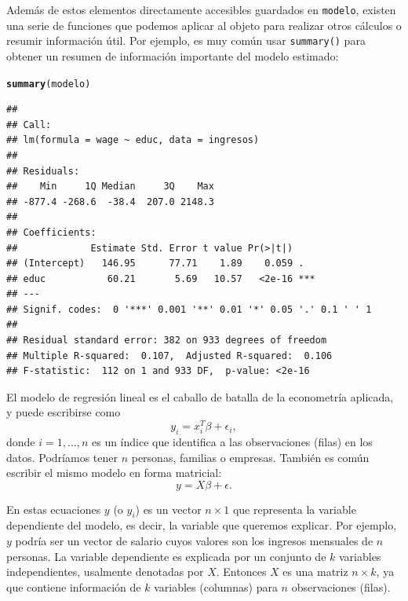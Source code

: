 \documentclass{article}\usepackage[]{graphicx}\usepackage[]{color}
\makeatletter
\newcommand{\hlstd}[1]{\textcolor[rgb]{0.345,0.345,0.345}{#1}}%
\newcommand{\hlkwd}[1]{\textcolor[rgb]{0.737,0.353,0.396}{\textbf{#1}}}%
\newenvironment{kframe}{%
 \def\at@end@of@kframe{}%
 \ifinner\ifhmode%
  \def\at@end@of@kframe{\end{minipage}}%
  \begin{minipage}{\columnwidth}%
 \fi\fi%
 \def\FrameCommand##1{\hskip\@totalleftmargin \hskip-\fboxsep
 \colorbox{shadecolor}{##1}\hskip-\fboxsep
     \hskip-\linewidth \hskip-\@totalleftmargin \hskip\columnwidth}%
 \MakeFramed {\advance\hsize-\width
   \@totalleftmargin\z@ \linewidth\hsize
   \@setminipage}}%
 {\par\unskip\endMakeFramed%
 \at@end@of@kframe}
\newenvironment{knitrout}{}{} %
\makeatother
\begin{document}
Además de estos elementos directamente accesibles guardados en \verb|modelo|, existen una serie de funciones que podemos aplicar al objeto para realizar otros cálculos o resumir información útil. Por ejemplo, es muy común usar \verb|summary()| para obtener un resumen de información importante del modelo estimado:
\begin{knitrout}
\color{fgcolor}\begin{kframe}
\begin{alltt}
\hlkwd{summary}\hlstd{(modelo)}
\end{alltt}
\begin{verbatim}
## 
## Call:
## lm(formula = wage ~ educ, data = ingresos)
## 
## Residuals:
##    Min     1Q Median     3Q    Max 
## -877.4 -268.6  -38.4  207.0 2148.3 
## 
## Coefficients:
##             Estimate Std. Error t value Pr(>|t|)    
## (Intercept)   146.95      77.71    1.89    0.059 .  
## educ           60.21       5.69   10.57   <2e-16 ***
## ---
## Signif. codes:  0 '***' 0.001 '**' 0.01 '*' 0.05 '.' 0.1 ' ' 1
## 
## Residual standard error: 382 on 933 degrees of freedom
## Multiple R-squared:  0.107,	Adjusted R-squared:  0.106 
## F-statistic:  112 on 1 and 933 DF,  p-value: <2e-16
\end{verbatim}
\end{kframe}
\end{knitrout}



\hrulefill

El modelo de regresión lineal es el caballo de batalla de la econometría aplicada, y puede escribirse como
\begin{equation}
y_i = x_i^T \beta + \epsilon_i,
\end{equation}
donde $i = 1, \ldots, n$ es un índice que identifica a las observaciones (filas) en los datos. Podríamos tener $n$ personas, familias o empresas.
También es común escribir el mismo modelo en forma matricial:
\begin{equation}
y = X \beta + \epsilon.
\end{equation}

En estas ecuaciones $y$ (o $y_i$) es un vector $n \times 1$ que representa la variable dependiente del modelo, es decir, la variable que queremos explicar. Por ejemplo, $y$ podría ser un vector de salario cuyos valores son los ingresos mensuales de $n$ personas.
La variable dependiente es explicada por un conjunto de $k$ variables independientes, usalmente denotadas por $X$. Entonces $X$ es una matriz $n\times k$, ya que contiene información de $k$ variables (columnas) para $n$ observaciones (filas).
\end{document}
